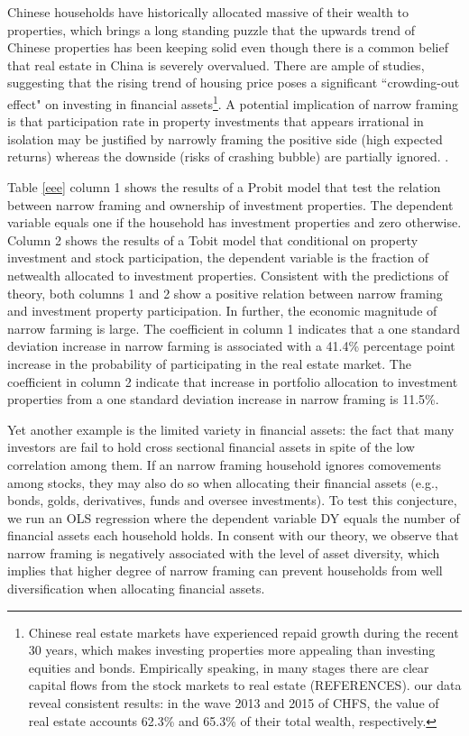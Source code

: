 \documentclass[ukenglish,nottitlepage,thmsb,11pt,letterpaper]{article}
\begin{document}
Chinese households have historically allocated massive of their wealth to properties, which brings a long standing puzzle that the upwards trend of Chinese properties has been keeping solid even though there is a common belief that real estate in China is severely overvalued. There are ample of studies, suggesting that the rising trend of housing price poses a significant ``crowding-out effect" on investing in financial assets\footnote{Chinese real estate markets have experienced repaid growth during the recent 30 years, which makes investing properties more appealing than investing equities and bonds. Empirically speaking, in many stages there are clear capital flows from the stock markets to real estate (REFERENCES).  our data reveal consistent results: in the wave 2013 and 2015 of CHFS,  the value of real estate accounts 62.3\% and 65.3\% of their total wealth, respectively.}. A potential implication of narrow framing is that participation rate in property investments that appears irrational in isolation may be justified by narrowly framing the positive side (high expected returns) whereas the downside (risks of crashing bubble) are partially ignored. .

Table \ref{eee} column 1 shows the results of a Probit model that test the relation between narrow framing and ownership of investment properties. The dependent variable equals one if the household has investment properties and zero otherwise. Column 2 shows the results of a Tobit model that conditional on property investment and stock participation,  the dependent variable is the fraction of netwealth allocated to investment properties. Consistent with the predictions of theory, both columns 1 and 2 show a positive relation between narrow framing and investment property participation. In further, the economic magnitude of narrow farming is large. The coefficient in column 1 indicates that a one standard deviation increase in narrow farming is associated with a 41.4\% percentage point increase in the probability of participating in the real estate market. The coefficient in column 2 indicate that increase in portfolio allocation to investment properties from a one standard deviation increase in narrow framing is 11.5\%.

Yet another example is the limited variety in financial assets: the fact that many investors are fail to hold cross sectional financial assets in spite of the low correlation among them. If an narrow framing household ignores comovements among stocks, they may also do so when allocating their financial assets (e.g., bonds, golds, derivatives, funds and oversee investments). To test this conjecture, we run an OLS regression where the dependent variable DY equals the number of financial assets each household holds. In consent with our theory, we observe that narrow framing is negatively associated with the level of asset diversity, which implies that higher degree of narrow framing can prevent households from well diversification when allocating financial assets. \\
                                                                                                                
\end{document}
